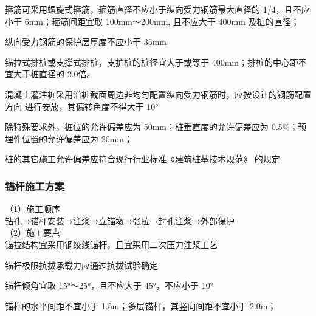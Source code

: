  箍筋可采用螺旋式箍筋，箍筋直径不应小于纵向受力钢筋最大直径的 1/4，且不应小于
6mm；箍筋间距宜取 100mm～200mm, 且不应大于 400mm 及桩的直径；

 纵向受力钢筋的保护层厚度不应小于 35mm

 锚拉式排桩或支撑式排桩，支护桩的桩径宜大于或等于 400mm；排桩的中心距不宜大于桩直径的 2.0倍。

 混凝土灌注桩采用沿桩截面周边非均匀配置纵向受力钢筋时，应按设计的钢筋配置方向
进行安放，其偏转角度不得大于 10°

 除特殊要求外，桩位的允许偏差应为 50mm；桩垂直度的允许偏差应为 0.5\%；预埋件位置的允许偏差应为 20mm；

 桩的其它施工允许偏差应符合现行行业标准《建筑桩基技术规范》 的规定

\begin{table*}
    \centering
    \caption{土层系数表}
    \label{tab:c6t1}
    \end{table*}   


\subsubsection{锚杆施工方案}

（1）施工顺序\\

钻孔→锚杆安装→注浆→立锚墩→张拉→封孔注浆→外部保护\\

（2）施工要点\\

 锚拉结构宜采用钢绞线锚杆，且宜采用二次压力注浆工艺

 锚杆极限抗拔承载力应通过抗拔试验确定

 锚杆倾角宜取 15°～25°，且不应大于 45°，不应小于 10°

 锚杆的水平间距不宜小于 1.5m；多层锚杆，其竖向间距不宜小于 2.0m；

